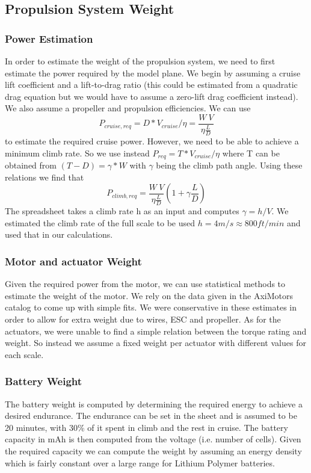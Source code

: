 \documentclass[titlepage,10pt]{article}
\begin{document}
\subsection{Propulsion System Weight}
\subsubsection{Power Estimation}
In order to estimate the weight of the propulsion system, we need to first estimate the power required by the model plane. We begin by assuming a cruise lift coefficient and a lift-to-drag ratio (this could be estimated from a quadratic drag equation but we would have to assume a zero-lift drag coefficient instead). We also assume a propeller and propulsion efficiencies. We can use $$P_{cruise,req} = D*V_{cruise}/\eta = \frac{W\ V}{\eta \frac{L}{D}}$$ to estimate the required cruise power. However, we need to be able to achieve a minimum climb rate. So we use instead $P_{req} = T*V_{cruise}/\eta$ where T can be obtained from $(T-D)=\gamma*W$ with $\gamma$ being the climb path angle. Using these relations we find that $$P_{climb,req} = \frac{W\ V}{\eta \frac{L}{D}}(1+\gamma \frac{L}{D})$$
The spreadsheet takes a climb rate h as an input and computes $\gamma=h/V$. We estimated the climb rate of the full scale to be used $h=4m/s\approx800ft/min$ and used that in our calculations.

\subsubsection{Motor and actuator Weight}
Given the required power from the motor, we can use statistical methods to estimate the weight of the motor. We rely on the data given in the AxiMotors catalog to come up with simple fits. We were conservative in these estimates in order to allow for extra weight due to wires, ESC and propeller. As for the actuators, we were unable to find a simple relation between the torque rating and weight. So instead we assume a fixed weight per actuator with different values for each scale.

\subsubsection{Battery Weight}
The battery weight is computed by determining the required energy to achieve a desired endurance. The endurance can be set in the sheet and is assumed to be 20 minutes, with 30\% of it spent in climb and the rest in cruise. The battery capacity in mAh is then computed from the voltage (i.e. number of cells). Given the required capacity we can compute the weight by assuming an energy density which is fairly constant over a large range for Lithium Polymer batteries. 
\end{document}
